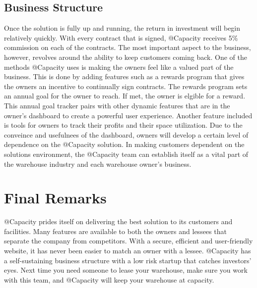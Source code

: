 \subsection{Business Structure}
Once the solution is fully up and running, the return in investment will begin relatively quickly. With every contract that is signed, @Capacity receives 5\% commission on each of the contracts. The most important aspect to the business, however, revolves around the ability to keep customers coming back. One of the methods @Capacity uses is making the owners feel like a valued part of the business. This is done by adding features such as a rewards program that gives the owners an incentive to continually sign contracts. The rewards program sets an annual goal for the owner to reach. If met, the owner is elgible for a reward. This annual goal tracker pairs with other dynamic features that are in the owner's dashboard to create a powerful user experience. Another feature included is tools for owners to track their profits and their space utilization. Due to the conveince and usefulnees of the dashboard, owners will develop a certain level of dependence on the @Capacity solution. In making customers dependent on the solutions environment, the @Capacity team can establish itself as a vital part of the warehouse industry and each warehouse owner's business. 

\section{Final Remarks}
@Capacity prides itself on delivering the best solution to its customers and facilities. Many features are available to both the owners and lessees that separate the company from competitors. With a secure, efficient and user-friendly website, it has never been easier to match an owner with a lessee. @Capacity has a self-sustaining business structure with a low risk startup that catches investors' eyes. Next time you need someone to lease your warehouse, make sure you work with this team, and @Capacity will keep your warehouse at capacity. 

